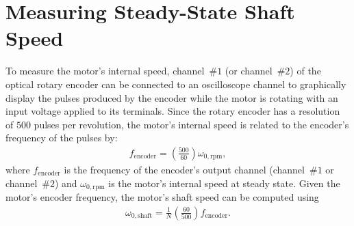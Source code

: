 \section{Measuring Steady-State Shaft Speed}
\label{sec:measuringShaftSpeed}
To measure the motor's internal speed, channel~$\#1$ (or channel~$\#2$) of the optical rotary encoder can be connected to an oscilloscope channel to graphically display the pulses produced by the encoder while the motor is rotating with an input voltage applied to its terminals. Since the rotary encoder has a resolution of $500$ pulses per revolution, the motor's internal speed is related to the encoder's frequency of the pulses by:
%
\begin{align}
  f_{\mathrm{encoder}} = \left(\frac{500}{60}\right)\omega_{0,\mathrm{rpm}},
  \label{eq:frequencyEncoder}
\end{align}
%
where $f_{\mathrm{encoder}}$ is the frequency of the encoder's output channel (channel~$\#1$ or channel~$\#2$) and  $\omega_{0,\mathrm{rpm}}$ is the motor's internal speed at steady state. Given the motor's encoder frequency, the motor's shaft speed can be computed using %
%
\begin{align}
  \omega_{0,\mathrm{shaft}} = \frac{1}{N}\left(\frac{60}{500}\right)f_{\mathrm{encoder}}.
  \label{eq:shaftSpeedMeasured}
\end{align}
%


